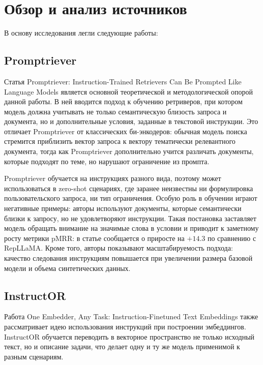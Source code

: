 \documentclass[12pt, a4paper, oneside]{article}
\begin{document}
\newpage

\section{Обзор и анализ источников}
\label{sec:links}

В основу исследования легли следующие работы:

\subsection{Promptriever}

Статья Promptriever: Instruction-Trained Retrievers Can Be Prompted Like Language Models \cite{weller2024promptriever} является основной 
теоретической и методологической опорой данной работы. В ней вводится подход к обучению ретриверов, при котором модель должна учитывать не 
только семантическую близость запроса и документа, но и дополнительные условия, заданные в текстовой инструкции. Это отличает Promptriever от 
классических би-энкодеров: обычная модель поиска стремится приблизить вектор запроса к вектору тематически релевантного документа, тогда как Promptriever 
дополнительно учится различать документы, которые подходят по теме, но нарушают ограничение из промпта.

Promptriever обучается на инструкциях разного вида, поэтому может использоваться в zero-shot сценариях, 
где заранее неизвестны ни формулировка пользовательского запроса, ни тип ограничения. Особую роль в обучении играют 
негативные примеры: авторы используют документы, которые семантически близки к запросу, но не удовлетворяют инструкции. Такая постановка 
заставляет модель обращать внимание на значимые слова в условии и приводит к заметному росту метрики pMRR: в статье сообщается о приросте на 
$+14.3$ по сравнению с RepLLaMA. Кроме того, авторы показывают масштабируемость подхода: качество следования инструкциям повышается при увеличении 
размера базовой модели и объема синтетических данных.

\subsection{InstructOR}

Работа One Embedder, Any Task: Instruction-Finetuned Text Embeddings \cite{su2023embeddertaskinstructionfinetunedtext} также 
рассматривает идею использования инструкций при построении эмбеддингов. InstructOR обучается переводить в векторное пространство 
не только исходный текст, но и описание задачи, что делает одну и ту же модель применимой к разным сценариям. 
\end{document}
